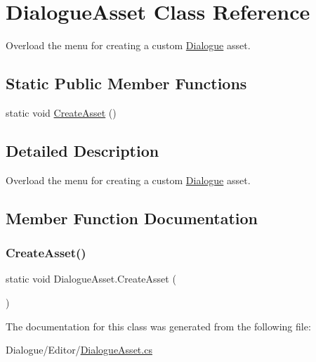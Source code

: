 \hypertarget{class_dialogue_asset}{}\section{Dialogue\+Asset Class Reference}
\label{class_dialogue_asset}


Overload the menu for creating a custom \mbox{\hyperlink{class_dialogue}{Dialogue}} asset.  


\subsection*{Static Public Member Functions}
\begin{DoxyCompactItemize}
\item 
static void \mbox{\hyperlink{class_dialogue_asset_a3f5b610dda86b22834c2429a926e8bd0}{Create\+Asset}} ()
\end{DoxyCompactItemize}


\subsection{Detailed Description}
Overload the menu for creating a custom \mbox{\hyperlink{class_dialogue}{Dialogue}} asset. 



\subsection{Member Function Documentation}
\mbox{\label{class_dialogue_asset_a3f5b610dda86b22834c2429a926e8bd0}} 
\subsubsection{\texorpdfstring{Create\+Asset()}{CreateAsset()}}
{\footnotesize\ttfamily static void Dialogue\+Asset.\+Create\+Asset (\begin{DoxyParamCaption}{ }\end{DoxyParamCaption})\hspace{0.3cm}{\ttfamily [static]}}



The documentation for this class was generated from the following file\+:\begin{DoxyCompactItemize}
\item 
Dialogue/\+Editor/\mbox{\hyperlink{_dialogue_asset_8cs}{Dialogue\+Asset.\+cs}}\end{DoxyCompactItemize}
